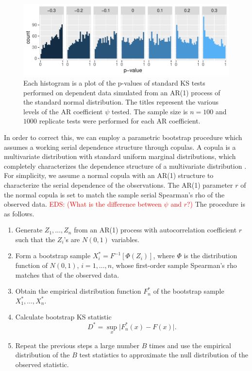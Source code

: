 \documentclass[12pt, letterpaper, titlepage]{article}
\newcommand{\eds}[1]{\textcolor{red}{EDS: (#1)}}
\begin{document}
\begin{figure}[tbp]
  \centering
  \includegraphics[width=\textwidth]{hist_correlation}
  \caption{Each histogram is a plot of the p-values of standard KS tests
  performed on dependent data simulated from an AR(1) process of the standard
  normal distribution. The titles represent the various levels of the AR
  coefficient $\psi$ tested. The sample size is $n = 100$ and $1000$ replicate
  tests were performed for each AR coefficient.}
  \label{fig:hist_correlation}
\end{figure}

In order to correct this, we can employ a parametric bootstrap procedure which
assumes a working serial dependence structure through copulas. A copula is a
multivariate distribution with standard uniform marginal distributions, which
completely characterizes the dependence structure of a multivariate
distribution \citep{Copula, Hofert}. For simplicity, we assume a normal copula
with an AR(1) structure to characterize the serial dependence of the
observations. The AR(1) parameter $r$ of the normal copula is set to match the
sample serial Spearman's rho of the observed data.
\eds{What is the difference between $\psi$ and $r$?}
The procedure is as
follows.

\begin{enumerate}
\item
  Generate $Z_1, \ldots, Z_n$ from an AR(1) process with autocorrelation
  coefficient $r$ such that the $Z_i$'s are $N(0, 1)$ variables.
\item
  Form a bootstrap sample $X_i^* = F^{-1} [\Phi(Z_i)]$, where $\Phi$ is the
  distribution function of $N(0, 1)$, $i = 1, \ldots, n$, whose first-order
  sample Spearman's rho matches that of the observed data.
\item
  Obtain the empirical distribution function $F_n^*$ of the bootstrap sample
  $X_1^*, \ldots, X_n^*$.
\item
  Calculate bootstrap KS statistic
  \[
    D^* = \sup_x \lvert F_n^* (x)- F(x) \rvert.
  \]
\item
  Repeat the previous steps a large number $B$ times and use the empirical
    distribution of the $B$ test statistics to approximate
    the null distribution of the observed statistic.
\end{enumerate}
\end{document}

